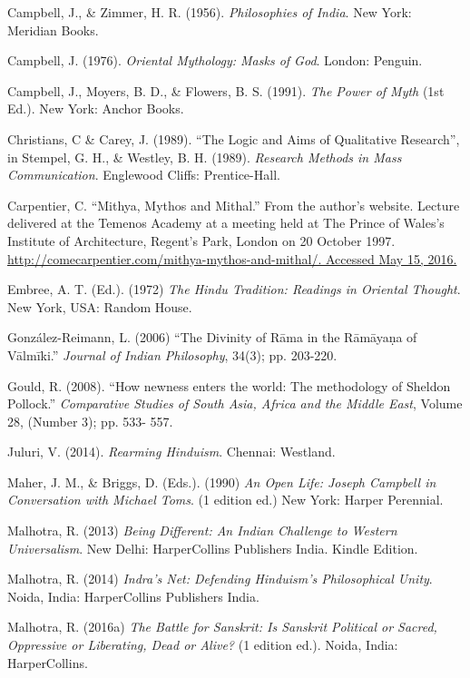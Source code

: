 \begin{thebibliography}{99}
 Campbell, J., \& Zimmer, H. R. (1956). \textit{Philosophies of India}. New York: Meridian Books.

  Campbell, J. (1976). \textit{Oriental Mythology: Masks of God}. London: Penguin.

  Campbell, J., Moyers, B. D., \& Flowers, B. S. (1991). \textit{The Power of Myth} (1st Ed.). New York: Anchor Books.

  Christians, C \& Carey, J. (1989). “The Logic and Aims of Qualitative Research”, in Stempel, G. H., \& Westley, B. H. (1989). \textit{Research Methods in Mass Communication}. Englewood Cliffs: Prentice-Hall.

  Carpentier, C. “Mithya, Mythos and Mithal.” From the author’s website. Lecture delivered at the Temenos Academy at a meeting held at The Prince of Wales's Institute of Architecture, Regent's Park, London on 20 October 1997. \url{http://comecarpentier.com/mithya-mythos-and-mithal/. Accessed May 15, 2016.}

  Embree, A. T. (Ed.). (1972) \textit{The Hindu Tradition: Readings in Oriental Thought}. New York, USA: Random House.

  González-Reimann, L. (2006) “The Divinity of Rāma in the Rāmāyaṇa of Vālmīki.” \textit{Journal of Indian Philosophy}, 34(3); pp. 203-220.

  Gould, R. (2008). “How newness enters the world: The methodology of Sheldon Pollock.” \textit{Comparative Studies of South Asia, Africa and the Middle East}, Volume 28, (Number 3); pp. 533- 557.

  Juluri, V. (2014). \textit{Rearming Hinduism}. Chennai: Westland.

  Maher, J. M., \& Briggs, D. (Eds.). (1990) \textit{An Open Life: Joseph Campbell in Conversation with Michael Toms}. (1 edition ed.) New York: Harper Perennial.

  Malhotra, R. (2013) \textit{Being Different: An Indian Challenge to Western Universalism}. New Delhi: HarperCollins Publishers India. Kindle Edition.

  Malhotra, R. (2014) \textit{Indra’s Net: Defending Hinduism’s Philosophical Unity}. Noida, India: HarperCollins Publishers India.

  Malhotra, R. (2016a) \textit{The Battle for Sanskrit: Is Sanskrit Political or Sacred, Oppressive or Liberating, Dead or Alive?} (1 edition ed.). Noida, India: HarperCollins.


\end{thebibliography}
